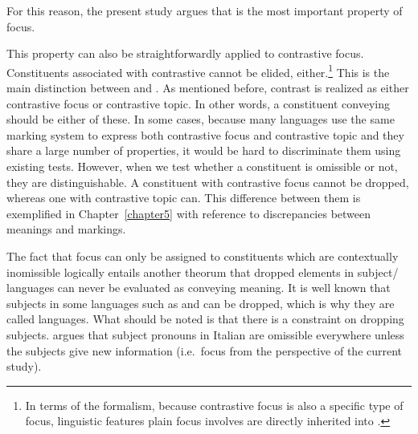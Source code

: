 \noindent For this reason, the present study argues that
 is the most important property of focus.



This property can also be straightforwardly applied to contrastive
focus. Constituents associated with contrastive  cannot be
elided, either.\footnote{In terms of the  formalism, because
  contrastive focus is also a specific type of focus, linguistic
  features plain focus involves are directly inherited into
  .} This is the main distinction between
 and . As mentioned
before, contrast is realized as either contrastive focus or
contrastive topic. In other words, a constituent conveying
 should be either of these. In some cases,
because many languages use the same marking system to express both
contrastive focus and contrastive topic and they share a large number
of properties, it would be hard to discriminate them using existing
tests. However, when we test whether a constituent is omissible or
not, they are distinguishable. A constituent with contrastive focus
cannot be dropped, whereas one with contrastive topic can. This
difference between them is exemplified in
Chapter~\ref{chapter5}  with reference to
discrepancies between meanings and markings.



The fact that focus can only be assigned to constituents which are  contextually inomissible
logically entails another theorum that dropped elements
in subject/ languages can never be evaluated as
conveying  meaning.  
It is well known that subjects in some languages such as 
 and  can be dropped, 
which is why they are called  languages.
What should be noted is that there is a constraint on
dropping subjects. \citet[406]{cinque:77} argues that subject
pronouns in Italian are omissible everywhere unless the subjects give
new information (i.e.\ focus from the perspective of the current
study).



